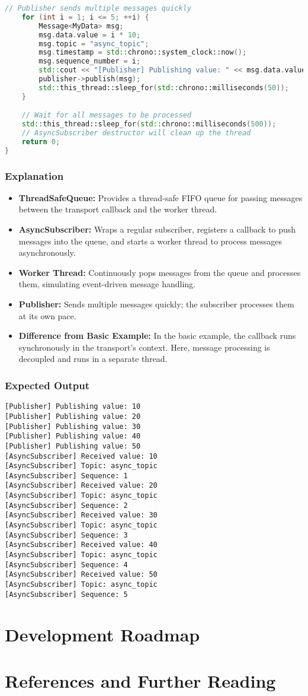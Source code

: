 \documentclass[12pt]{report}
\begin{document}
\begin{lstlisting}[language=C++]
    // Publisher sends multiple messages quickly
    for (int i = 1; i <= 5; ++i) {
        Message<MyData> msg;
        msg.data.value = i * 10;
        msg.topic = "async_topic";
        msg.timestamp = std::chrono::system_clock::now();
        msg.sequence_number = i;
        std::cout << "[Publisher] Publishing value: " << msg.data.value << std::endl;
        publisher->publish(msg);
        std::this_thread::sleep_for(std::chrono::milliseconds(50));
    }

    // Wait for all messages to be processed
    std::this_thread::sleep_for(std::chrono::milliseconds(500));
    // AsyncSubscriber destructor will clean up the thread
    return 0;
}
\end{lstlisting}

\subsection{Explanation}
\begin{itemize}
    \item \textbf{ThreadSafeQueue:} Provides a thread-safe FIFO queue for passing messages between the transport callback and the worker thread.
    \item \textbf{AsyncSubscriber:} Wraps a regular subscriber, registers a callback to push messages into the queue, and starts a worker thread to process messages asynchronously.
    \item \textbf{Worker Thread:} Continuously pops messages from the queue and processes them, simulating event-driven message handling.
    \item \textbf{Publisher:} Sends multiple messages quickly; the subscriber processes them at its own pace.
    \item \textbf{Difference from Basic Example:} In the basic example, the callback runs synchronously in the transport's context. Here, message processing is decoupled and runs in a separate thread.
\end{itemize}

\subsection{Expected Output}
\begin{lstlisting}
[Publisher] Publishing value: 10
[Publisher] Publishing value: 20
[Publisher] Publishing value: 30
[Publisher] Publishing value: 40
[Publisher] Publishing value: 50
[AsyncSubscriber] Received value: 10
[AsyncSubscriber] Topic: async_topic
[AsyncSubscriber] Sequence: 1
[AsyncSubscriber] Received value: 20
[AsyncSubscriber] Topic: async_topic
[AsyncSubscriber] Sequence: 2
[AsyncSubscriber] Received value: 30
[AsyncSubscriber] Topic: async_topic
[AsyncSubscriber] Sequence: 3
[AsyncSubscriber] Received value: 40
[AsyncSubscriber] Topic: async_topic
[AsyncSubscriber] Sequence: 4
[AsyncSubscriber] Received value: 50
[AsyncSubscriber] Topic: async_topic
[AsyncSubscriber] Sequence: 5
\end{lstlisting}

\chapter{Development Roadmap}

\appendix
\chapter{References and Further Reading}
\end{document}
